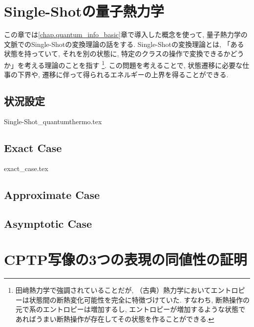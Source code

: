 \documentclass[report]{jlreq}
\begin{document}

\chapter{Single-Shotの量子熱力学}
この章では\ref{chap.quantum_info_basic}章で導入した概念を使って, 量子熱力学の文脈でのSingle-Shotの変換理論の話をする. 
Single-Shotの変換理論とは, 「ある状態を持っていて, それを別の状態に, 特定のクラスの操作で変換できるかどうか」を考える理論のことを指す
\footnote{田﨑熱力学で強調されていることだが, （古典）熱力学においてエントロピーは状態間の断熱変化可能性を完全に特徴づけていた. 
すなわち, 断熱操作の元で系のエントロピーは増加するし, エントロピーが増加するような状態であればうまい断熱操作が存在してその状態を作ることができる. }. 
この問題を考えることで, 状態遷移に必要な仕事の下界や, 遷移に伴って得られるエネルギーの上界を得ることができる. 

\section{状況設定}\label{sec.Single-Shot_quantumthermo}
{Single-Shot_quantumthermo.tex}
\section{Exact Case}
{exact_case.tex}
\section{Approximate Case}
\section{Asymptotic Case}

\appendix
\chapter{CPTP写像の3つの表現の同値性の証明}
\end{document}
